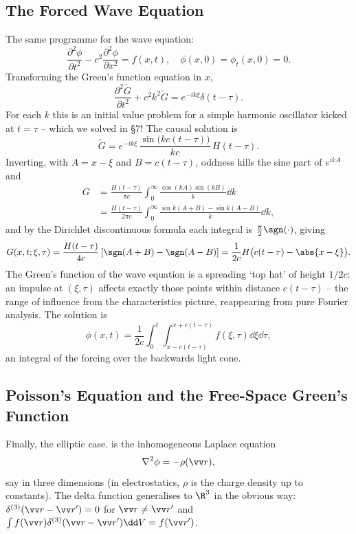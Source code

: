 \subsection{The Forced Wave Equation}

The same programme for the wave equation:
$$
\frac{\partial^2 \phi}{\partial t^2} - c^2 \frac{\partial^2 \phi}{\partial x^2} = f(x, t), \quad \phi(x, 0) = \phi_t(x, 0) = 0.
$$
Transforming the Green's function equation in $x$,
$$
\frac{\partial^2 \tilde{G}}{\partial t^2} + c^2 k^2 \tilde{G} = e^{-ik\xi} \delta(t - \tau).
$$
For each $k$ this is an initial value problem for a simple harmonic oscillator kicked at $t = \tau$ -- which we solved in \S 7! The causal solution is
$$
\tilde{G} = e^{-ik \xi}\, \frac{\sin \big(kc(t - \tau)\big)}{kc}\, H(t - \tau).
$$
Inverting, with $A = x - \xi$ and $B = c(t - \tau)$, oddness kills the sine part of $e^{ikA}$ and
\begin{align*}
G &= \frac{H(t - \tau)}{\pi c} \int_0^{\infty} \frac{\cos (kA) \sin (kB)}{k} \dd k \\
&= \frac{H(t - \tau)}{2\pi c}\int_0^{\infty} \frac{\sin k(A + B) - \sin k (A - B)}{k} \dd k,
\end{align*}
and by the Dirichlet discontinuous formula each integral is $\frac{\pi}{2}\sgn(\cdot)$, giving
$$
G(x, t; \xi, \tau) = \frac{H(t - \tau)}{4c}\left[\sgn(A + B) - \sgn(A - B)\right] = \frac{1}{2c} H\big(c(t - \tau) - \abs{x - \xi}\big).
$$
The Green's function of the wave equation is a spreading `top hat' of height $1/2c$: an impulse at $(\xi, \tau)$ affects exactly those points within distance $c(t - \tau)$ -- the range of influence from the characteristics picture, reappearing from pure Fourier analysis. The solution is
$$
\phi(x, t) = \frac{1}{2c}\int_0^t \int_{x - c(t - \tau)}^{x + c(t - \tau)} f(\xi, \tau) \dd \xi \dd \tau,
$$
an integral of the forcing over the backwards light cone.

\subsection{Poisson's Equation and the Free-Space Green's Function}

Finally, the elliptic case.  is the inhomogeneous Laplace equation
$$
\nabla^2 \phi = -\rho(\vv r),
$$
say in three dimensions (in electrostatics, $\rho$ is the charge density up to constants). The delta function generalises to $\R^3$ in the obvious way: $\delta^{(3)}(\vv r - \vv r') = 0$ for $\vv r \neq \vv r'$ and $\int f(\vv r) \delta^{(3)}(\vv r - \vv r')\dd V = f(\vv r')$.

